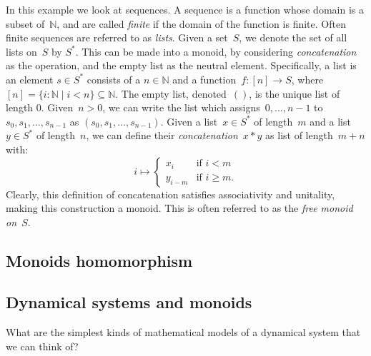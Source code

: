 \begin{example}
In this example we look at sequences. A sequence is a function whose domain is a subset of~$\mathbb{N}$, and are called \emph{finite} if the domain of the function is finite. Often finite sequences are referred to as \emph{lists}. Given a set~$S$, we denote the set of all lists on~$S$ by $S^\ast$. This can be made into a monoid, by considering \emph{concatenation} as the operation, and the empty list as the neutral element. Specifically, a list is an element $s\in S^\ast$ consists of a $n\in \mathbb{N}$ and a function~$f\colon [n]\to S$, where~$[n]=\{i\colon \mathbb{N}\mid i<n\}\subseteq \mathbb{N}$. The empty list, denoted~$()$, is the unique list of length 0. Given~$n>0$, we can write the list which assigns~$0,\ldots,n-1$ to~$s_0,s_1,\ldots,s_{n-1}$ as $(s_0,s_1,\ldots,s_{n-1})$. Given a list~$x\in S^\ast$ of length~$m$ and a list~$y\in S^\ast$ of length~$n$, we can define their \emph{concatenation}~$x*y$ as list of length~$m+n$ with:
\begin{equation*}
    i\mapsto
    \begin{cases}
    x_i&\text{if }i<m\\
    y_{i-m}&\text{if }i\geq m.
    \end{cases}
\end{equation*}
Clearly, this definition of concatenation satisfies associativity and unitality, making this construction a monoid. This is often referred to as the \emph{free monoid on~$S$}.
\end{example}

\subsection{Monoids homomorphism}



\subsection{Dynamical systems and monoids}


What are the simplest kinds of mathematical models of a dynamical system that we can think of? 


